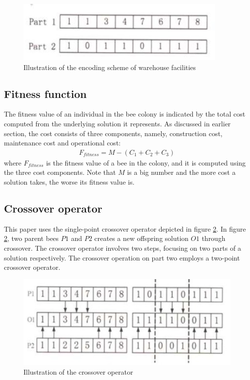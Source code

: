 \begin{figure}[h!]
	\begin{center}
		\includegraphics[width=0.5\linewidth]{sections/figure1.jpg}
		\caption{Illustration of the encoding scheme of warehouse facilities}
		\label{fig:fig1}
	\end{center}
\end{figure}

\subsection{Fitness function}
The fitness value of an individual in the bee colony is indicated by the total cost computed from the underlying solution it represents.
As discussed in earlier section, the cost consists of three components, namely, construction cost, maintenance cost and operational cost:
\begin{align}
	F_{fitness} = M - (C_1 + C_2 + C_3)
\end{align}
where $F_{fitness}$ is the fitness value of a bee in the colony, and it is computed using the three cost components.
Note that $M$ is a big number and the more cost a solution takes, the worse its fitness value is.

\subsection{Crossover operator}
This paper uses the single-point crossover operator depicted in figure \ref{fig:fig2}.
In figure \ref{fig:fig2}, two parent bees $P1$ and $P2$ creates a new offspring solution $O1$ through crossover.
The crossover operator involves two steps, focusing on two parts of a solution respectively.
The crossover operation on part two employs a two-point crossover operator.

\begin{figure}[h!]
	\begin{center}
		\includegraphics[width=0.5\linewidth]{sections/figure2.jpg}
		\caption{Illustration of the crossover operator}
		\label{fig:fig2}
	\end{center}
\end{figure}

